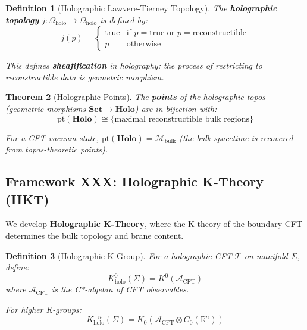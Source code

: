 \documentclass[12pt,a4paper]{article}
\newtheorem{theorem}{Theorem}[section]
\newtheorem{definition}[theorem]{Definition}
\begin{document}
\begin{definition}[Holographic Lawvere-Tierney Topology]\label{def:holo-lt-topology}
The \textbf{holographic topology} $j: \Omega_{\text{holo}} \to \Omega_{\text{holo}}$ is defined by:
\begin{equation}
j(p) = \begin{cases}
\text{true} & \text{if } p = \text{true} \text{ or } p = \text{reconstructible} \\
p & \text{otherwise}
\end{cases}
\end{equation}

This defines \textbf{sheafification} in holography: the process of restricting to reconstructible data is geometric morphism.
\end{definition}

\begin{theorem}[Holographic Points]\label{thm:holo-points}
The \textbf{points} of the holographic topos (geometric morphisms $\mathbf{Set} \to \mathbf{Holo}$) are in bijection with:
\begin{equation}
\text{pt}(\mathbf{Holo}) \cong \{ \text{maximal reconstructible bulk regions} \}
\end{equation}

For a CFT vacuum state, $\text{pt}(\mathbf{Holo}) = \mathcal{M}_{\text{bulk}}$ (the bulk spacetime is recovered from topos-theoretic points).
\end{theorem}

\subsection{Framework XXX: Holographic K-Theory (HKT)}
\label{subsec:holographic-k-theory}

We develop \textbf{Holographic K-Theory}, where the K-theory of the boundary CFT determines the bulk topology and brane content.

\begin{definition}[Holographic K-Group]\label{def:holo-k-group}
For a holographic CFT $\mathcal{T}$ on manifold $\Sigma$, define:
\begin{equation}
K_{\text{holo}}^0(\Sigma) = K^0(\mathcal{A}_{\text{CFT}})
\end{equation}
where $\mathcal{A}_{\text{CFT}}$ is the C*-algebra of CFT observables.

For higher K-groups:
\begin{equation}
K_{\text{holo}}^{-n}(\Sigma) = K_0(\mathcal{A}_{\text{CFT}} \otimes C_0(\mathbb{R}^n))
\end{equation}
\end{definition}
\end{document}
